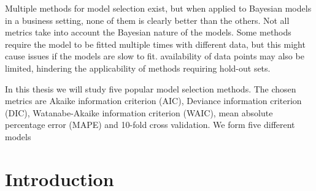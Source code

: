 \documentclass[english, 12pt, a4paper, sci, utf8, a-1b, online]{aaltothesis}
\date{14.10.2020}
\begin{document}
\makecoverpage{}


\makecopyrightpage{}


\begin{abstractpage}[english]
Multiple methods for model selection exist, but when applied to Bayesian models in a business setting, none of them is clearly better than the others. Not all metrics take into account the Bayesian nature of the models. Some methods require the model to be fitted multiple times with different data, but this might cause issues if the models are slow to fit. availability of data points may also be limited, hindering the applicability of methods requiring hold-out sets.

In this thesis we will study five popular model selection methods. The chosen metrics are Akaike information criterion (AIC), Deviance information criterion (DIC), Watanabe-Akaike information criterion (WAIC), mean absolute percentage error (MAPE) and 10-fold cross validation. We form five different models 

\newpage



\begin{abstractpage}[finnish]
\end{abstractpage}


\thesistableofcontents

\cleardoublepage

\section{Introduction}


\end{abstractpage}
\end{document}
